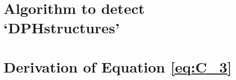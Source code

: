 \documentclass[12pt, %
english, %
singlespacing, %
2%
headsepline, %
]{MastersDoctoralThesis} %
\begin{document}
\appendix

\chapter[Algorithm to detect `DPHstructures']{Algorithm to detect `DPHstructures'}
\label{appendix:DPHstructures}


\chapter[Derivation of Equation \ref{eq:C_3}]{Derivation of Equation \ref{eq:C_3}}
\label{appendix:derivation_of_C3}





\cleardoublepage
{}
{}




\end{document}

